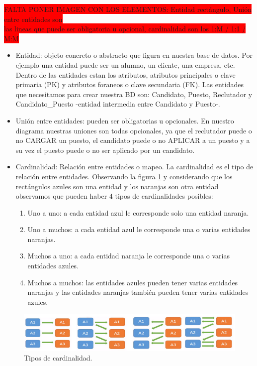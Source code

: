 \documentclass[12pt,a4paper]{article}
\begin{document}
\begin{sloppypar}
\colorbox{red}{FALTA PONER IMAGEN CON LOS ELEMENTOS: Entidad rectángulo, Unión entre entidades son} \\ \colorbox{red}{las lineas que puede ser obligatoria u opcional, cardinalidad son los 1:M / 1:1 / M:M}

\begin{itemize}
\item Entidad: objeto concreto o abstracto que figura en nuestra base de datos. Por ejemplo una entidad puede ser un alumno, un cliente, una empresa, etc. Dentro de las entidades estan los atributos, atributos principales o clave primaria (PK) y atributos foraneos o clave secundaria (FK).  Las entidades que necesitamos para crear nuestra BD son: Candidato, Puesto, Reclutador y Candidato\_Puesto -entidad intermedia entre Candidato y Puesto-.
\item Unión entre entidades: pueden ser obligatorias u opcionales. En nuestro diagrama nuestras uniones son todas opcionales, ya que el reclutador puede o no CARGAR un puesto, el candidato puede o no APLICAR a un puesto y a su vez el puesto puede o no ser aplicado por un candidato. 
\item Cardinalidad: Relación entre entidades o mapeo. La cardinalidad es el tipo de relación entre entidades. Observando la figura \ref{fig:Cardinalidad} y considerando que los rectángulos azules son una entidad y los naranjas son otra entidad observamos que pueden haber 4 tipos de cardinalidades posibles:

\begin{enumerate}
\item Uno a uno: a cada entidad azul le corresponde solo una entidad naranja.
\item Uno a muchos: a cada entidad azul le corresponde una o varias entidades naranjas.
\item Muchos a uno: a cada entidad naranja le corresponde una o varias entidades azules.
\item Muchos a muchos: las entidades azules pueden tener varias entidades naranjas y las entidades naranjas también pueden tener varias entidades azules.
\end{enumerate}
\end{itemize}

\begin{figure}[H]    %
  \centering
  \includegraphics[width=1\textwidth]{images/Cardinalidad.png}
  \caption{Tipos de cardinalidad.}  
  \label{fig:Cardinalidad}
\end{figure}


\end{sloppypar}
\end{document}
